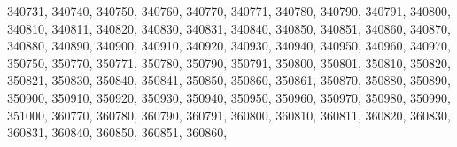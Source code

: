 \textquotesingle{}340731\textquotesingle{}, \textquotesingle{}340740\textquotesingle{}, \textquotesingle{}340750\textquotesingle{}, \textquotesingle{}340760\textquotesingle{}, \textquotesingle{}340770\textquotesingle{}, \textquotesingle{}340771\textquotesingle{}, \textquotesingle{}340780\textquotesingle{}, \textquotesingle{}340790\textquotesingle{}, \textquotesingle{}340791\textquotesingle{}, \textquotesingle{}340800\textquotesingle{}, \textquotesingle{}340810\textquotesingle{}, \textquotesingle{}340811\textquotesingle{}, \textquotesingle{}340820\textquotesingle{}, \textquotesingle{}340830\textquotesingle{}, \textquotesingle{}340831\textquotesingle{}, \textquotesingle{}340840\textquotesingle{}, \textquotesingle{}340850\textquotesingle{}, \textquotesingle{}340851\textquotesingle{}, \textquotesingle{}340860\textquotesingle{}, \textquotesingle{}340870\textquotesingle{}, \textquotesingle{}340880\textquotesingle{}, \textquotesingle{}340890\textquotesingle{}, \textquotesingle{}340900\textquotesingle{}, \textquotesingle{}340910\textquotesingle{}, \textquotesingle{}340920\textquotesingle{}, \textquotesingle{}340930\textquotesingle{}, \textquotesingle{}340940\textquotesingle{}, \textquotesingle{}340950\textquotesingle{}, \textquotesingle{}340960\textquotesingle{}, \textquotesingle{}340970\textquotesingle{}, \textquotesingle{}350750\textquotesingle{}, \textquotesingle{}350770\textquotesingle{}, \textquotesingle{}350771\textquotesingle{}, \textquotesingle{}350780\textquotesingle{}, \textquotesingle{}350790\textquotesingle{}, \textquotesingle{}350791\textquotesingle{}, \textquotesingle{}350800\textquotesingle{}, \textquotesingle{}350801\textquotesingle{}, \textquotesingle{}350810\textquotesingle{}, \textquotesingle{}350820\textquotesingle{}, \textquotesingle{}350821\textquotesingle{}, \textquotesingle{}350830\textquotesingle{}, \textquotesingle{}350840\textquotesingle{}, \textquotesingle{}350841\textquotesingle{}, \textquotesingle{}350850\textquotesingle{}, \textquotesingle{}350860\textquotesingle{}, \textquotesingle{}350861\textquotesingle{}, \textquotesingle{}350870\textquotesingle{}, \textquotesingle{}350880\textquotesingle{}, \textquotesingle{}350890\textquotesingle{}, \textquotesingle{}350900\textquotesingle{}, \textquotesingle{}350910\textquotesingle{}, \textquotesingle{}350920\textquotesingle{}, \textquotesingle{}350930\textquotesingle{}, \textquotesingle{}350940\textquotesingle{}, \textquotesingle{}350950\textquotesingle{}, \textquotesingle{}350960\textquotesingle{}, \textquotesingle{}350970\textquotesingle{}, \textquotesingle{}350980\textquotesingle{}, \textquotesingle{}350990\textquotesingle{}, \textquotesingle{}351000\textquotesingle{}, \textquotesingle{}360770\textquotesingle{}, \textquotesingle{}360780\textquotesingle{}, \textquotesingle{}360790\textquotesingle{}, \textquotesingle{}360791\textquotesingle{}, \textquotesingle{}360800\textquotesingle{}, \textquotesingle{}360810\textquotesingle{}, \textquotesingle{}360811\textquotesingle{}, \textquotesingle{}360820\textquotesingle{}, \textquotesingle{}360830\textquotesingle{}, \textquotesingle{}360831\textquotesingle{}, \textquotesingle{}360840\textquotesingle{}, \textquotesingle{}360850\textquotesingle{}, \textquotesingle{}360851\textquotesingle{}, \textquotesingle{}360860\textquotesingle{}, 